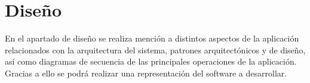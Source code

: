 \chapter{Diseño}

En el apartado de diseño se realiza mención a distintos aspectos de la aplicación relacionados con la arquitectura del sistema, patrones arquitectónicos y de diseño, así como diagramas de secuencia de las principales operaciones de la aplicación. Gracias a ello se podrá realizar una representación del software a desarrollar.



